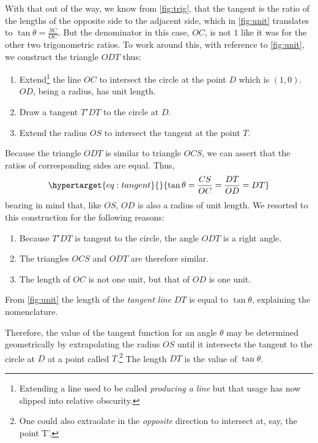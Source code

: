 \documentclass[
  a4paper,
]{article}
\providecommand{\tightlist}{%
  \setlength{\itemsep}{0pt}\setlength{\parskip}{0pt}}
\begin{document}
With that out of the way, we know from \cref{fig:trig}, that the tangent
is the ratio of the lengths of the opposite side to the adjacent side,
which in \cref{fig:unit} translates to \(\tan\theta = \frac{SC}{OC}\).
But the denominator in this case, \(OC\), is not \(1\) like it was for
the other two trigonometric ratios. To work around this, with reference
to \cref{fig:unit}, we construct the triangle \(ODT\) thus:

\begin{enumerate}
\def\labelenumi{\alph{enumi}.}
\tightlist
\item
  Extend\footnote{Extending a line used to be called \emph{producing a
    line} but that usage has now slipped into relative obscurity.} the
  line \(OC\) to intersect the circle at the point \(D\) which is
  \((1, 0)\). \(OD\), being a radius, has unit length.
\item
  Draw a tangent \(T'DT\) to the circle at \(D\).
\item
  Extend the radius \(OS\) to intersect the tangent at the point \(T\).
\end{enumerate}

Because the triangle \(ODT\) is similar to triangle \(OCS\), we can
assert that the ratios of corresponding sides are equal. Thus,
\begin{equation}\protect\hypertarget{eq:tangent}{}{
\tan\theta = \frac{CS}{OC} = \frac{DT}{OD} = DT
}\label{eq:tangent}\end{equation} bearing in mind that, like \(OS\),
\(OD\) is also a radius of unit length. We resorted to this construction
for the following reasons:

\begin{enumerate}
\tightlist
\item
  Because \(T'DT\) is tangent to the circle, the angle \(ODT\) is a
  right angle.
\item
  The triangles \(OCS\) and \(ODT\) are therefore similar.
\item
  The length of \(OC\) is not one unit, but that of \(OD\) is one unit.
\end{enumerate}

From \cref{fig:unit} the length of the \emph{tangent line} \(DT\) is
equal to \(\tan\theta\), explaining the nomenclature.

Therefore, the value of the tangent function for an angle \(\theta\) may
be determined geometrically by extrapolating the radius \(OS\) until it
intersects the tangent to the circle at \(D\) at a point called
\(T\).\footnote{One could also extraolate in the \emph{opposite}
  direction to intersect at, say, the point T'.} The length \(DT\) is
the value of \(\tan\theta\).
\end{document}
